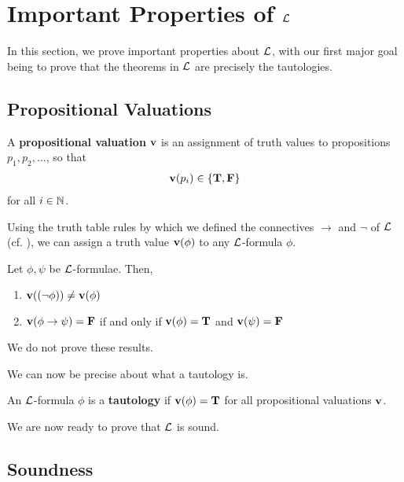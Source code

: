 \section{Important Properties of $\mathcal{L}$}

In this section, we prove important properties about $\mathcal{L}$, with our first major goal being to prove that the theorems in $\mathcal{L}$ are precisely the tautologies.

\subsection{Propositional Valuations}

\begin{boxdefinition}
    A \textbf{propositional valuation} $\mathbf{v}$ is an assignment of truth values to propositions $p_1, p_2, \ldots$, so that
    \begin{align*}
        \mathbf{v}\!\left( p_i \right) \in \left\{ \mathbf{T}, \mathbf{F} \right\}
    \end{align*}
    for all $i \in \mathbb{N}$.
\end{boxdefinition}

Using the truth table rules by which we defined the connectives $\to$ and $\neg$ of $\mathcal{L}$ (cf. ), we can assign a truth value $\mathbf{v}\!\left( \phi \right)$ to any $\mathcal{L}$-formula $\phi$.

\begin{boxlemma}\label{Ch1:Lemma:PropValBhv}
    Let $\phi, \psi$ be $\mathcal{L}$-formulae. Then,
    \begin{enumerate}
        \item $\mathbf{v}\!\left( \left( \neg \phi \right) \right) \neq \mathbf{v}\!\left( \phi \right)$
        \item $\mathbf{v}\!\left( \phi \to \psi \right) = \mathbf{F}$ if and only if $\mathbf{v}\!\left( \phi \right) = \mathbf{T}$ and $\mathbf{v}\!\left( \psi \right) = \mathbf{F}$
    \end{enumerate}
\end{boxlemma}

We do not prove these results.

We can now be precise about what a tautology is.

\begin{boxdefinition}[Tautology]
    An $\mathcal{L}$-formula $\phi$ is a \textbf{tautology} if $\mathbf{v}\!\left( \phi \right) = \mathbf{T}$ for all propositional valuations $\mathbf{v}$.
\end{boxdefinition}

We are now ready to prove that $\mathcal{L}$ is sound.

\subsection{Soundness}


